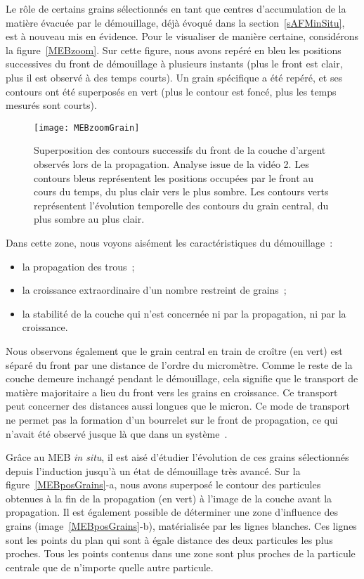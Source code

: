Le rôle de certains grains sélectionnés en tant que centres d'accumulation de la matière évacuée par le démouillage, déjà évoqué dans la section~\ref{sAFMinSitu}, est à nouveau mis en évidence. Pour le visualiser de manière certaine, considérons la figure~\ref{MEBzoom}. Sur cette figure, nous avons repéré en bleu les positions successives du front de démouillage à plusieurs instants (plus le front est clair, plus il est observé à des temps courts). Un grain spécifique a été repéré, et ses contours ont été superposés en vert (plus le contour est foncé, plus les temps mesurés sont courts).\par 

\begin{figure}[h]
	\centering
	\texttt{[image: MEBzoomGrain]}
	\caption{Superposition des contours successifs du front de la couche d'argent observés lors de la propagation. Analyse issue de la vidéo 2. Les contours bleus représentent les positions occupées par le front au cours du temps, du plus clair vers le plus sombre. Les contours verts représentent l'évolution temporelle des contours du grain central, du plus sombre au plus clair.}
	\label{MEBzoomGrain}
\end{figure}

Dans cette zone, nous voyons aisément les caractéristiques du démouillage~:
\begin{itemize}
\item la propagation des trous~;
\item la croissance extraordinaire d'un nombre restreint de grains~;
\item la stabilité de la couche qui n'est concernée ni par la propagation, ni par la croissance. 
\end{itemize}
Nous observons également que le grain central en train de croître (en vert) est séparé du front par une distance de l'ordre du micromètre. Comme le reste de la couche demeure inchangé pendant le démouillage, cela signifie que le transport de matière majoritaire a lieu du front vers les grains en croissance. Ce transport peut concerner des distances aussi longues que le micron. Ce mode de transport ne permet pas la formation d'un bourrelet sur le front de propagation, ce qui n'avait été observé jusque là que dans un système~\cite{kovalenko2013solid}.\par

Grâce au MEB \textit{in situ}, il est aisé d'étudier l'évolution de ces grains sélectionnés depuis l'induction jusqu'à un état de démouillage très avancé. Sur la figure~\ref{MEBposGrains}-a, nous avons superposé le contour des particules obtenues à la fin de la propagation (en vert) à l'image de la couche avant la propagation. Il est également possible de déterminer une \og zone d'influence \fg{} des grains (image~\ref{MEBposGrains}-b), matérialisée par les lignes blanches. Ces lignes sont les points du plan qui sont à égale distance des deux particules les plus proches. Tous les points contenus dans une zone sont plus proches de la particule centrale que de n'importe quelle autre particule.\par 

